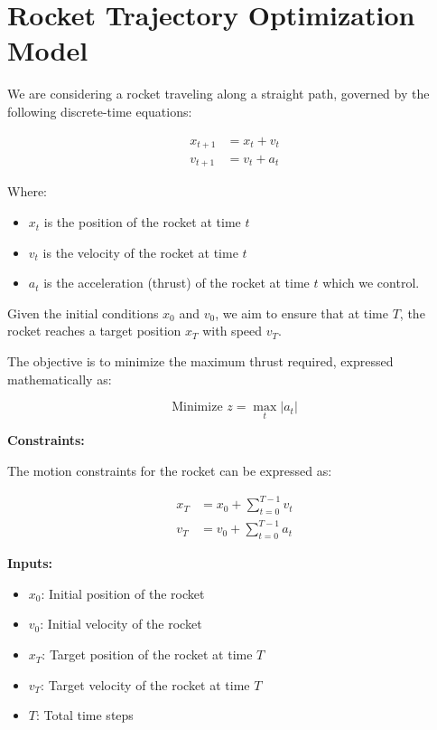 \documentclass{article}
\begin{document}
\section*{Rocket Trajectory Optimization Model}

We are considering a rocket traveling along a straight path, governed by the following discrete-time equations:

\begin{align}
    x_{t+1} &= x_t + v_t \\
    v_{t+1} &= v_t + a_t
\end{align}

Where:
\begin{itemize}
    \item \( x_t \) is the position of the rocket at time \( t \)
    \item \( v_t \) is the velocity of the rocket at time \( t \)
    \item \( a_t \) is the acceleration (thrust) of the rocket at time \( t \) which we control.
\end{itemize}

Given the initial conditions \( x_0 \) and \( v_0 \), we aim to ensure that at time \( T \), the rocket reaches a target position \( x_T \) with speed \( v_T \).

The objective is to minimize the maximum thrust required, expressed mathematically as:

\[
\text{Minimize } z = \max_{t} |a_t|
\]

\textbf{Constraints:}

The motion constraints for the rocket can be expressed as:

\begin{align}
    x_{T} &= x_0 + \sum_{t=0}^{T-1} v_t \\
    v_{T} &= v_0 + \sum_{t=0}^{T-1} a_t
\end{align}

\textbf{Inputs:}
\begin{itemize}
    \item \( x_0 \): Initial position of the rocket
    \item \( v_0 \): Initial velocity of the rocket
    \item \( x_T \): Target position of the rocket at time \( T \)
    \item \( v_T \): Target velocity of the rocket at time \( T \)
    \item \( T \): Total time steps
\end{itemize}
\end{document}

